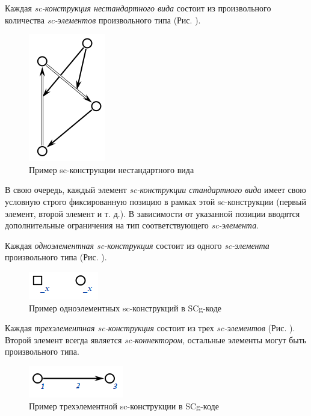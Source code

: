Каждая \textit{sc-конструкция нестандартного вида} состоит из произвольного количества \textit{sc-элементов} произвольного типа (Рис. \textit{}).

\begin{figure}[H]
	\centering
	\includegraphics[scale=0.8]{images/part3/chapter_situation_management/pic_ps1.png}
	\caption{Пример sc-конструкции нестандартного вида}
	\label{fig:pic_ps1}
\end{figure}

В свою очередь, каждый элемент \textit{\mbox{sc-конструкции} стандартного вида} имеет свою условную строго фиксированную позицию в рамках этой \mbox{sc-конструкции} (первый элемент, второй элемент и т. д.). В зависимости от указанной позиции вводятся дополнительные ограничения на тип соответствующего \textit{sc-элемента}.

Каждая \textit{одноэлементная sc-конструкция} состоит из одного \textit{sc-элемента} произвольного типа (Рис. \textit{}).

\begin{figure}[H]
	\centering
	\includegraphics[scale=0.8]{images/part3/chapter_situation_management/pic_ps2.png}
	\caption{Пример одноэлементных sc-конструкций в SCg-коде}
	\label{fig:pic_ps2}
\end{figure}

Каждая \textit{трехэлементная sc-конструкция} состоит из трех \textit{sc-элементов} (Рис. \textit{}). Второй элемент всегда является \textit{sc-коннектором}, остальные элементы могут быть произвольного типа.

\begin{figure}[H]
	\centering
	\includegraphics[scale=0.8]{images/part3/chapter_situation_management/pic_ps3.png}
	\caption{Пример трехэлементной sc-конструкции в SCg-коде}
	\label{fig:pic_ps3}
\end{figure}

